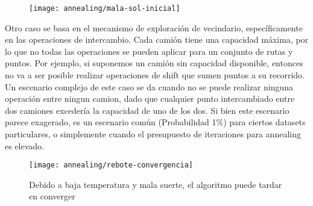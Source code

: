 \begin{figure}[H]
\texttt{[image: annealing/mala-sol-inicial]}
\centering
\end{figure}

Otro caso se basa en el mecanismo de exploración de vecindario, específicamente en las operaciones de intercambio. Cada camión tiene una capacidad máxima, por lo que no todas las operaciones se pueden aplicar para un conjunto de rutas y puntos.
Por ejemplo, si suponemos un camión sin capacidad disponible, entonces no va a ser posible realizar operaciones de shift que sumen puntos a su recorrido.
Un escenario complejo de este caso se da cuando no se puede realizar ninguna operación entre ningun camion, dado que cualquier punto intercambiado entre dos camiones excedería la capacidad de uno de los dos.
Si bien este escenario parece exagerado, es un escenario común (Probabilidad 1\%) para ciertos datasets particulares, o simplemente cuando el presupuesto de iteraciones para annealing es elevado.

\begin{figure}[H]
\texttt{[image: annealing/rebote-convergencia]}
\centering
\caption{Debido a baja temperatura y mala suerte, el algoritmo puede tardar en converger}

\end{figure}
